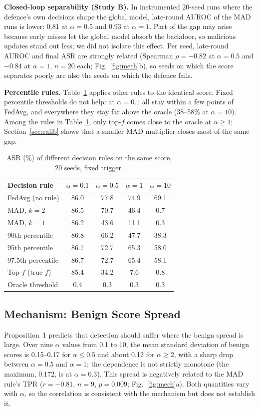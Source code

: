 \textbf{Closed-loop separability (Study B).} In instrumented 20-seed runs where the defence's own decisions shape the global model, late-round AUROC of the MAD runs is lower: $0.81$ at $\alpha=0.5$ and $0.93$ at $\alpha=1$. Part of the gap may arise because early misses let the global model absorb the backdoor, so malicious updates stand out less; we did not isolate this effect. Per seed, late-round AUROC and final ASR are strongly related (Spearman $\rho=-0.82$ at $\alpha=0.5$ and $-0.84$ at $\alpha=1$, $n=20$ each; Fig.~\ref{fig:mech}b), so seeds on which the score separates poorly are also the seeds on which the defence fails.

\textbf{Percentile rules.} Table~\ref{tab:rules} applies other rules to the identical score. Fixed percentile thresholds do not help: at $\alpha=0.1$ all stay within a few points of FedAvg, and everywhere they stay far above the oracle (38--58\% at $\alpha=10$). Among the rules in Table~\ref{tab:rules}, only top-$f$ comes close to the oracle at $\alpha\ge1$; Section~\ref{sec:calib} shows that a smaller MAD multiplier closes most of the same gap.
\begin{table}[t]
\caption{ASR (\%) of different decision rules on the same score, 20 seeds, fixed trigger.}
\label{tab:rules}
\centering\footnotesize
\begin{tabular}{@{}lcccc@{}}
\toprule
Decision rule & $\alpha{=}0.1$ & $\alpha{=}0.5$ & $\alpha{=}1$ & $\alpha{=}10$\\
\midrule
FedAvg (no rule) & 86.0 & 77.8 & 74.9 & 69.1\\
MAD, $k{=}2$ & 86.5 & 70.7 & 46.4 & 0.7\\
MAD, $k{=}1$ & 86.2 & 43.6 & 11.1 & 0.3\\
90th percentile & 86.8 & 66.2 & 47.7 & 38.3\\
95th percentile & 86.7 & 72.7 & 65.3 & 58.0\\
97.5th percentile & 86.7 & 72.7 & 65.4 & 58.1\\
Top-$f$ (true $f$) & 85.4 & 34.2 & 7.6 & 0.8\\
Oracle threshold & 0.4 & 0.3 & 0.3 & 0.3\\
\bottomrule
\end{tabular}
\end{table}

\subsection{Mechanism: Benign Score Spread}\label{sec:mech}
Proposition~1 predicts that detection should suffer where the benign spread is large. Over nine $\alpha$ values from 0.1 to 10, the mean standard deviation of benign scores is 0.15--0.17 for $\alpha\le0.5$ and about 0.12 for $\alpha\ge2$, with a sharp drop between $\alpha=0.5$ and $\alpha=1$; the dependence is not strictly monotone (the maximum, 0.172, is at $\alpha=0.3$). This spread is negatively related to the MAD rule's TPR ($r=-0.81$, $n=9$, $p=0.009$; Fig.~\ref{fig:mech}a). Both quantities vary with $\alpha$, so the correlation is consistent with the mechanism but does not establish it.

